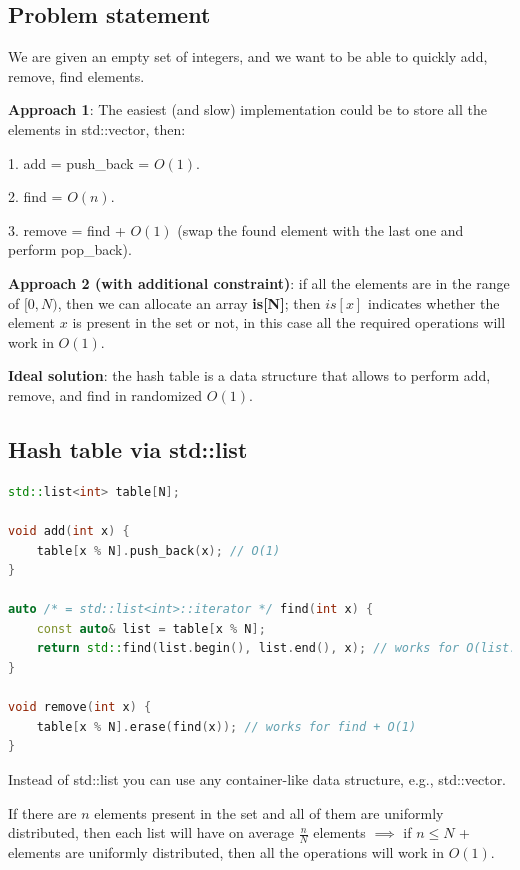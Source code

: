 \subsection{Problem statement}

We are given an empty set of integers, and we want to be able to quickly add, remove, find elements.

\textbf{Approach 1}: The easiest (and slow) implementation could be to store all the elements in std::vector, then:

1. add = push\_back = $O(1)$.

2. find = $O(n)$.

3. remove = find + $O(1)$ (swap the found element with the last one and perform pop\_back).

\textbf{Approach 2 (with additional constraint)}: if all the elements are in the range of $[0, N)$, then we can allocate an array \textbf{is[N]}; then $is[x]$ indicates whether the element $x$ is present in the set or not, in this case all the required operations will work in $O(1)$.

\textbf{Ideal solution}: the hash table is a data structure that allows to perform add, remove, and find in randomized $O(1)$.



\subsection{Hash table via std::list}

\begin{lstlisting}[language=C++]
std::list<int> table[N];

void add(int x) {
    table[x % N].push_back(x); // O(1)
}

auto /* = std::list<int>::iterator */ find(int x) {
    const auto& list = table[x % N];
    return std::find(list.begin(), list.end(), x); // works for O(list.size())
}

void remove(int x) {
    table[x % N].erase(find(x)); // works for find + O(1)
}
\end{lstlisting}

Instead of std::list you can use any container-like data structure, e.g., std::vector.

If there are $n$ elements present in the set and all of them are uniformly distributed, then each list will have on average $\frac{n}{N}$ elements $\implies$ if $n \leq N$ + elements are uniformly distributed, then all the operations will work in $O(1)$.

